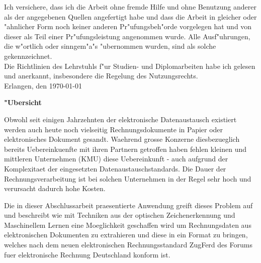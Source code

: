 \documentclass[english,mt]{lmedoc}
\begin{document}
\clearpage
  \begin{deckblatt}
  \end{deckblatt}

\cleardoublepage


Ich versichere, dass ich die Arbeit ohne fremde Hilfe und ohne Benutzung
anderer als der angegebenen Quellen angefertigt habe und dass die Arbeit
in gleicher oder "ahnlicher Form noch keiner anderen Pr"ufungsbeh"orde
vorgelegen hat und von dieser als Teil einer Pr"ufungsleistung
angenommen wurde. Alle Ausf"uhrungen, die w"ortlich oder sinngem"a"s
"ubernommen wurden, sind als solche gekennzeichnet.
\\

Die Richtlinien des Lehrstuhls f"ur Studien- und Diplomarbeiten
habe ich gelesen und anerkannt, insbesondere die Regelung des
Nutzungsrechts. \\[15mm]
Erlangen, den  \today \hspace{6.0cm} \\[10mm]


\cleardoublepage

\begin{center}
\bfseries
"Ubersicht
\normalfont

Obwohl seit einigen Jahrzehnten der elektronische Datenaustausch existiert werden auch heute noch vielseitig Rechnungsdokumente in Papier oder elektronisches Dokument gesandt. Waehrend grosse Konzerne diesbezueglich bereits Uebereinkuenfte mit ihren Partnern getroffen haben fehlen kleinen und mittleren Unternehmen (KMU) diese Uebereinkunft - auch aufgrund der Komplexitaet der eingesetzten Datenaustauschstandards.
Die Dauer der Rechnungsverarbeitung ist bei solchen Unternehmen in der Regel sehr hoch und verursacht dadurch hohe Kosten. 

Die in dieser Abschlussarbeit praesentierte Anwendung greift dieses Problem auf und beschreibt wie mit Techniken aus der optischen Zeichenerkennung und Maschinellem Lernen eine Moeglichkeit geschaffen wird um Rechnungsdaten aus elektronischen Dokumenten zu extrahieren und diese in ein Format zu bringen, welches nach dem neuen elektronischen Rechnungsstandard ZugFerd des Forums fuer elektronische Rechnung Deutschland konform ist.

\end{center}
\end{document}

